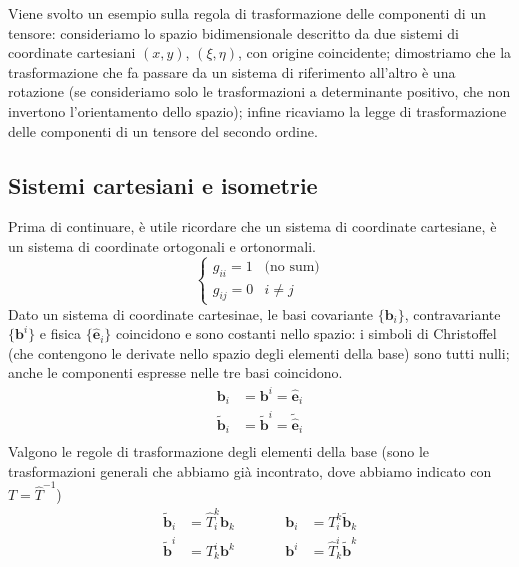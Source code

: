 Viene svolto un esempio sulla regola di trasformazione delle componenti di un tensore:
 consideriamo lo spazio bidimensionale descritto da due sistemi di coordinate cartesiani $(x,y)$, $(\xi,\eta)$,
 con origine coincidente; dimostriamo che la trasformazione che fa passare da un sistema
 di riferimento all'altro è una rotazione (se consideriamo solo le trasformazioni a 
 determinante positivo, che non invertono l'orientamento dello spazio); infine ricaviamo 
 la legge di trasformazione delle componenti di un tensore del secondo ordine.
 
 \subsection{Sistemi cartesiani e isometrie}
 
 Prima di continuare, è utile ricordare che un sistema di coordinate cartesiane, è un sistema
  di coordinate ortogonali e ortonormali.
 \begin{equation}
  \begin{cases}
   g_{ii} = 1 & \text{(no sum)} \\
   g_{ij} = 0 & i \ne j  
  \end{cases}
 \end{equation}
 Dato un sistema di coordinate cartesinae, le basi covariante $\{\bm{b}_i\}$, contravariante $\{\bm{b}^i\}$ e fisica 
  $\{\bm{\hat{e}}_i\}$ coincidono e sono costanti nello spazio: i simboli di Christoffel
 (che contengono le derivate nello spazio degli elementi della base) sono tutti nulli; anche le componenti
  espresse nelle tre basi coincidono.
 \begin{equation}
 \begin{aligned}
  \bm{b}_i & = \bm{b}^i = \bm{\hat{e}}_i \\
  \tilde{\bm{b}}_i & = \tilde{\bm{b}}^i = \tilde{\bm{\hat{e}}}_i \\
 \end{aligned}
 \end{equation}
 Valgono le regole di trasformazione degli elementi della base (sono le trasformazioni generali che abbiamo
 già incontrato, dove abbiamo indicato con $T = \hat{T}^{-1}$)
 \begin{equation}
 \begin{aligned}
  \tilde{\bm{b}}_i & = \hat{T}^k_i \bm{b}_k \quad && \quad \bm{b}_i & =      T^k_i  \tilde{\bm{b}}_k \\
  \tilde{\bm{b}}^i & =      T^i_k  \bm{b}^k \quad && \quad \bm{b}^i & = \hat{T}^i_k \tilde{\bm{b}}^k
 \end{aligned}
 \end{equation}
 
